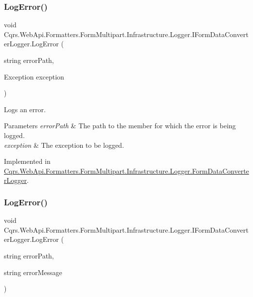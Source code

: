 \subsubsection{\texorpdfstring{Log\+Error()}{LogError()}\hspace{0.1cm}{\footnotesize\ttfamily [1/2]}}
{\footnotesize\ttfamily void Cqrs.\+Web\+Api.\+Formatters.\+Form\+Multipart.\+Infrastructure.\+Logger.\+I\+Form\+Data\+Converter\+Logger.\+Log\+Error (\begin{DoxyParamCaption}\item[{string}]{error\+Path,  }\item[{Exception}]{exception }\end{DoxyParamCaption})}



Logs an error. 


\begin{DoxyParams}{Parameters}
{\em error\+Path} & The path to the member for which the error is being logged.\\
\hline
{\em exception} & The exception to be logged.\\
\hline
\end{DoxyParams}


Implemented in \hyperlink{classCqrs_1_1WebApi_1_1Formatters_1_1FormMultipart_1_1Infrastructure_1_1Logger_1_1FormDataConverterLogger_ab54b4f24cc7ee7eacddbb9900a832ca3}{Cqrs.\+Web\+Api.\+Formatters.\+Form\+Multipart.\+Infrastructure.\+Logger.\+Form\+Data\+Converter\+Logger}.

\mbox{\label{interfaceCqrs_1_1WebApi_1_1Formatters_1_1FormMultipart_1_1Infrastructure_1_1Logger_1_1IFormDataConverterLogger_a0067054a5f882d2687e8fd9f9ae38e9b}} 
\subsubsection{\texorpdfstring{Log\+Error()}{LogError()}\hspace{0.1cm}{\footnotesize\ttfamily [2/2]}}
{\footnotesize\ttfamily void Cqrs.\+Web\+Api.\+Formatters.\+Form\+Multipart.\+Infrastructure.\+Logger.\+I\+Form\+Data\+Converter\+Logger.\+Log\+Error (\begin{DoxyParamCaption}\item[{string}]{error\+Path,  }\item[{string}]{error\+Message }\end{DoxyParamCaption})}



